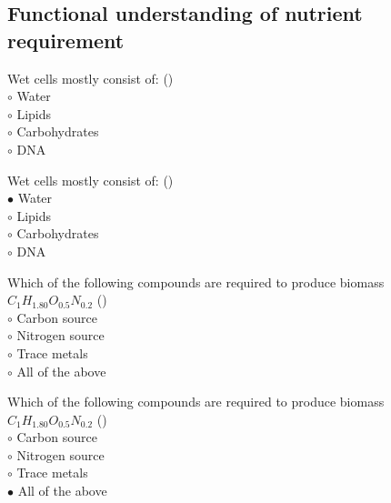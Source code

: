 \documentclass[]{beamer}
\begin{document}
\subsection{Functional understanding of nutrient requirement}
\setcounter{questions}{0}
\setcounter{answers}{0}
\begin{frame}[shrink] {}
\addtocounter{questions}{1}
\color{blue}
Wet cells mostly consist of: ()\\
\color{black}
\setlength{\parindent}{-0.4cm}
{\color{red}$\circ$} Water\\
{\color{red}$\circ$} Lipids\\
{\color{red}$\circ$} Carbohydrates\\
{\color{red}$\circ$} DNA \\
\end{frame}
\begin{frame}[shrink] {}
\addtocounter{answers}{1}
\color{blue}
Wet cells mostly consist of: ()\\
\color{black}
\setlength{\parindent}{-0.4cm}
{\color{red}$\bullet$} Water\\
{\color{red}$\circ$} Lipids\\
{\color{red}$\circ$} Carbohydrates\\
{\color{red}$\circ$} DNA \\
\end{frame}
\begin{frame}[shrink] {}
\addtocounter{questions}{1}
\color{blue}
Which of the following compounds are required to produce biomass $C_1H_{1.80}O_{0.5}N_{0.2}$ ()\\
\color{black}
\setlength{\parindent}{-0.4cm}
{\color{red}$\circ$}  Carbon source\\
{\color{red}$\circ$} Nitrogen source\\
{\color{red}$\circ$} Trace metals\\
{\color{red}$\circ$} All of the above \\
\end{frame}
\begin{frame}[shrink] {}
\addtocounter{answers}{1}
\color{blue}
Which of the following compounds are required to produce biomass $C_1H_{1.80}O_{0.5}N_{0.2}$ ()\\
\color{black}
\setlength{\parindent}{-0.4cm}
{\color{red}$\circ$}  Carbon source\\
{\color{red}$\circ$} Nitrogen source\\
{\color{red}$\circ$} Trace metals\\
{\color{red}$\bullet$} All of the above \\
\end{frame}
\end{document}
